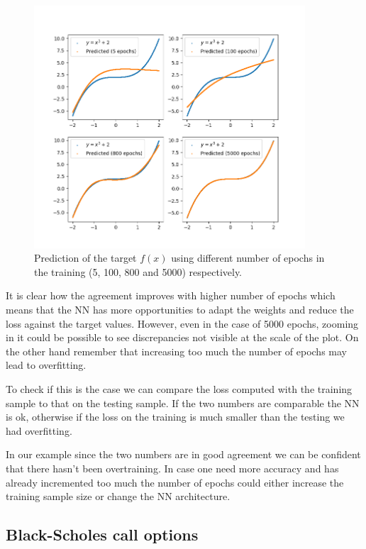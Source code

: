 \begin{figure}[htb]
	\centering
	\includegraphics[width=0.9\textwidth]{figures/training_vs_epoch}
	\caption{Prediction of the target $f(x)$ using different number of epochs in the training (5, 100, 800 and 5000) respectively.}
	\label{fig:training_vs_epochs}
\end{figure}

It is clear how the agreement improves with higher number of epochs which means that the NN has more opportunities to adapt the weights and reduce the loss against the target values. However, even in the case of 5000 epochs, zooming in it could be possible to see discrepancies not visible at the scale of the plot. On the other hand remember that increasing too much the number of epochs may lead to overfitting. 

To check if this is the case we can compare the loss computed with the training sample to that on the testing sample. If the two numbers are comparable the NN is ok, otherwise if the loss on the training is much smaller than the testing we had overfitting.

In our example since the two numbers are in good agreement we can be confident that there hasn't been overtraining.
In case one need more accuracy and has already incremented too much the number of epochs could either increase the training sample size or change the NN architecture.

\subsection{Black-Scholes call options}
\label{black-scholes-call-options}

